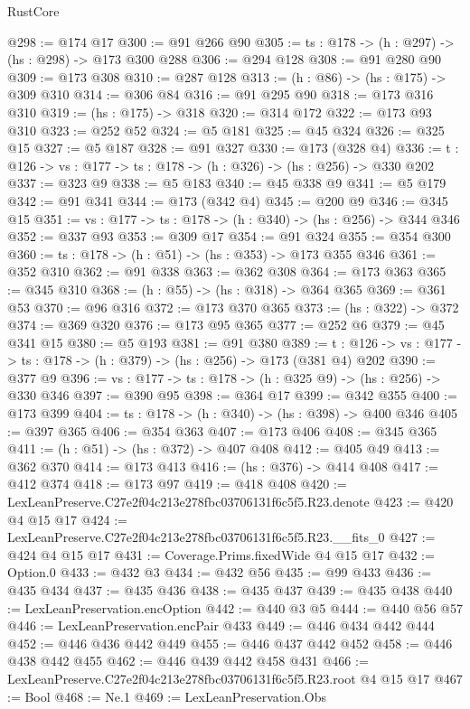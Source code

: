 \begin{lexlean}{RustCore}
\begin{coremodule}
@298 := @174 @17
@300 := @91 @266 @90
@305 := {ts : @178} -> (h : @297) -> (hs : @298) -> @173 @300 @288
@306 := @294 @128
@308 := @91 @280 @90
@309 := @173 @308
@310 := @287 @128
@313 := (h : @86) -> (hs : @175) -> @309 @310
@314 := @306 @84
@316 := @91 @295 @90
@318 := @173 @316 @310
@319 := (hs : @175) -> @318
@320 := @314 @172
@322 := @173 @93 @310
@323 := @252 @52
@324 := @5 @181
@325 := @45 @324
@326 := @325 @15
@327 := @5 @187
@328 := @91 @327
@330 := @173 (@328 @4)
@336 := {t : @126} -> {vs : @177} -> {ts : @178} -> (h : @326) -> (hs : @256) -> @330 @202
@337 := @323 @9
@338 := @5 @183
@340 := @45 @338 @9
@341 := @5 @179
@342 := @91 @341
@344 := @173 (@342 @4)
@345 := @200 @9
@346 := @345 @15
@351 := {vs : @177} -> {ts : @178} -> (h : @340) -> (hs : @256) -> @344 @346
@352 := @337 @93
@353 := @309 @17
@354 := @91 @324
@355 := @354 @300
@360 := {ts : @178} -> (h : @51) -> (hs : @353) -> @173 @355 @346
@361 := @352 @310
@362 := @91 @338
@363 := @362 @308
@364 := @173 @363
@365 := @345 @310
@368 := (h : @55) -> (hs : @318) -> @364 @365
@369 := @361 @53
@370 := @96 @316
@372 := @173 @370 @365
@373 := (hs : @322) -> @372
@374 := @369 @320
@376 := @173 @95 @365
@377 := @252 @6
@379 := @45 @341 @15
@380 := @5 @193
@381 := @91 @380
@389 := {t : @126} -> {vs : @177} -> {ts : @178} -> (h : @379) -> (hs : @256) -> @173 (@381 @4) @202
@390 := @377 @9
@396 := {vs : @177} -> {ts : @178} -> (h : @325 @9) -> (hs : @256) -> @330 @346
@397 := @390 @95
@398 := @364 @17
@399 := @342 @355
@400 := @173 @399
@404 := {ts : @178} -> (h : @340) -> (hs : @398) -> @400 @346
@405 := @397 @365
@406 := @354 @363
@407 := @173 @406
@408 := @345 @365
@411 := (h : @51) -> (hs : @372) -> @407 @408
@412 := @405 @49
@413 := @362 @370
@414 := @173 @413
@416 := (hs : @376) -> @414 @408
@417 := @412 @374
@418 := @173 @97
@419 := @418 @408
@420 := LexLeanPreserve.C27e2f04c213e278fbc03706131f6c5f5.R23.denote
@423 := @420 @4 @15 @17
@424 := LexLeanPreserve.C27e2f04c213e278fbc03706131f6c5f5.R23.__fits_0
@427 := @424 @4 @15 @17
@431 := Coverage.Prims.fixedWide @4 @15 @17
@432 := Option.{0}
@433 := @432 @3
@434 := @432 @56
@435 := @99 @433
@436 := @435 @434
@437 := @435 @436
@438 := @435 @437
@439 := @435 @438
@440 := LexLeanPreservation.encOption
@442 := @440 @3 @5
@444 := @440 @56 @57
@446 := LexLeanPreservation.encPair @433
@449 := @446 @434 @442 @444
@452 := @446 @436 @442 @449
@455 := @446 @437 @442 @452
@458 := @446 @438 @442 @455
@462 := @446 @439 @442 @458 @431
@466 := LexLeanPreserve.C27e2f04c213e278fbc03706131f6c5f5.R23.root @4 @15 @17
@467 := Bool
@468 := Ne.{1}
@469 := LexLeanPreservation.Obs

\end{coremodule}
\end{lexlean}
